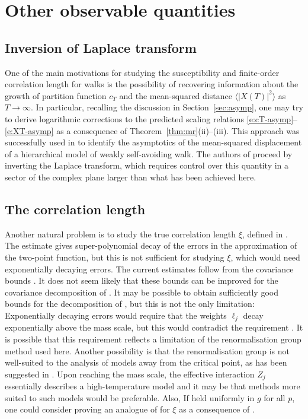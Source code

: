 
\section{Other observable quantities}


\subsection{Inversion of Laplace transform}

One of the main motivations for studying the
susceptibility and finite-order correlation length for walks is the possibility
of recovering information about the growth of partition function $c_T$ and
the mean-squared distance $\langle |X(T)|^2 \rangle$ as $T\to\infty$. In
particular, recalling the discussion in Section~\ref{sec:asymp}, one may
try to derive logarithmic corrections to the predicted scaling relations
\eqref{e:cT-asymp}--\eqref{e:XT-asymp} as a consequence of Theorem~\ref{thm:mr}(ii)--(iii).
This approach was successfully used in \REF to identify the asymptotics of the
mean-squared displacement of a hierarchical model of weakly self-avoiding walk.
The authors of \REF proceed by inverting the Laplace transform, which requires
control over this quantity in a sector of the complex plane larger than what
has been achieved here.


\subsection{The correlation length}

Another natural problem is to study the true correlation length $\xi$, defined in
\REF. The estimate \REF gives super-polynomial decay of the errors in the approximation
\REF of the two-point function, but this is not sufficient for studying $\xi$, which
would need exponentially decaying errors. The current estimates follow from the
covariance bounds \REF. It does not seem likely that these bounds can be improved
for the covariance decomposition of \cite{Baue13a}. It may be possible to obtain
sufficiently good bounds for the decomposition of \cite{BGM04}, but this is not the
only limitation: Exponentially decaying errors would require that the weights $\ell_j$
decay exponentially above the mass scale, but this would contradict the requirement \REF.
It is possible that this requirement reflects a limitation of the renormalisation group
method used here. Another possibility is that the renormalisation group is not well-suited
to the analysis of models away from the critical point, as has been suggested in \REF.
Upon reaching the mass scale, the effective interaction $Z_j$ essentially describes
a high-temperature model and it may be that methods more suited to such models would be
preferable. Also, If \REF held uniformly in $g$ for all $p$, one could consider proving
an analogue of \REF for $\xi$ as a consequence of \REF.
